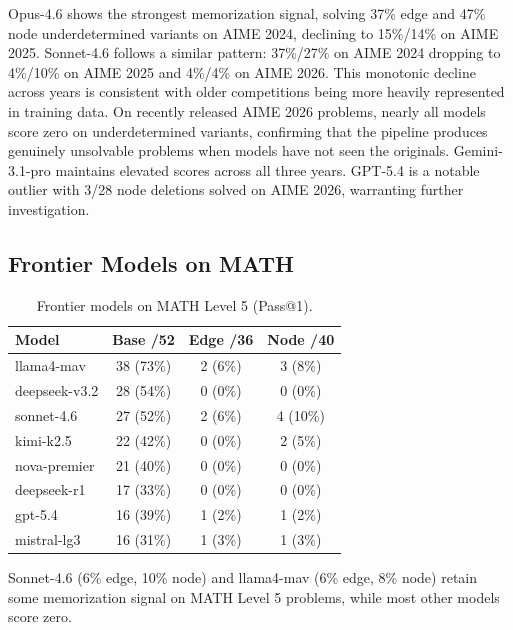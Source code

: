 \documentclass{article} %
\begin{document}
Opus-4.6 shows the strongest memorization signal, solving 37\% edge and 47\% node underdetermined variants on AIME 2024, declining to 15\%/14\% on AIME 2025. Sonnet-4.6 follows a similar pattern: 37\%/27\% on AIME 2024 dropping to 4\%/10\% on AIME 2025 and 4\%/4\% on AIME 2026. This monotonic decline across years is consistent with older competitions being more heavily represented in training data. On recently released AIME 2026 problems, nearly all models score zero on underdetermined variants, confirming that the pipeline produces genuinely unsolvable problems when models have not seen the originals. Gemini-3.1-pro maintains elevated scores across all three years. GPT-5.4 is a notable outlier with 3/28 node deletions solved on AIME 2026, warranting further investigation.


\subsection{Frontier Models on MATH}
\label{sec:frontier_math}

\begin{table}[h]
\centering
\begin{tabular}{lccc}
\toprule
Model & Base /52 & Edge /36 & Node /40 \\
\midrule
llama4-mav & 38 (73\%) & 2 (6\%) & 3 (8\%) \\
deepseek-v3.2 & 28 (54\%) & 0 (0\%) & 0 (0\%) \\
sonnet-4.6 & 27 (52\%) & 2 (6\%) & 4 (10\%) \\
kimi-k2.5 & 22 (42\%) & 0 (0\%) & 2 (5\%) \\
nova-premier & 21 (40\%) & 0 (0\%) & 0 (0\%) \\
deepseek-r1 & 17 (33\%) & 0 (0\%) & 0 (0\%) \\
gpt-5.4 & 16 (39\%) & 1 (2\%) & 1 (2\%) \\
mistral-lg3 & 16 (31\%) & 1 (3\%) & 1 (3\%) \\
\bottomrule
\end{tabular}
\caption{Frontier models on MATH Level 5 (Pass@1).}
\label{tab:frontier_math}
\end{table}

Sonnet-4.6 (6\% edge, 10\% node) and llama4-mav (6\% edge, 8\% node) retain some memorization signal on MATH Level 5 problems, while most other models score zero.

\end{document}
